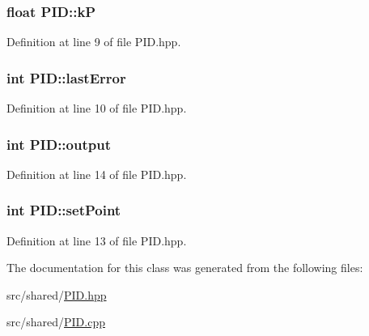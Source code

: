 \hypertarget{classPID_ac4815cca85109a6e13b10c2415104328}{
\subsubsection[{k\-P}]{\setlength{\rightskip}{0pt plus 5cm}float P\-I\-D\-::k\-P}}\label{classPID_ac4815cca85109a6e13b10c2415104328}


Definition at line 9 of file P\-I\-D.\-hpp.

\hypertarget{classPID_abbf07ac762e11dc7fedf56302c7bda8e}{
\subsubsection[{last\-Error}]{\setlength{\rightskip}{0pt plus 5cm}int P\-I\-D\-::last\-Error}}\label{classPID_abbf07ac762e11dc7fedf56302c7bda8e}


Definition at line 10 of file P\-I\-D.\-hpp.

\hypertarget{classPID_a34f2887b625d8d49e546b4e2fb389d04}{
\subsubsection[{output}]{\setlength{\rightskip}{0pt plus 5cm}int P\-I\-D\-::output}}\label{classPID_a34f2887b625d8d49e546b4e2fb389d04}


Definition at line 14 of file P\-I\-D.\-hpp.

\hypertarget{classPID_a2686d248042aff0e1730dd3a0b705fd2}{
\subsubsection[{set\-Point}]{\setlength{\rightskip}{0pt plus 5cm}int P\-I\-D\-::set\-Point}}\label{classPID_a2686d248042aff0e1730dd3a0b705fd2}


Definition at line 13 of file P\-I\-D.\-hpp.



The documentation for this class was generated from the following files\-:\begin{DoxyCompactItemize}
\item 
src/shared/\hyperlink{PID_8hpp}{P\-I\-D.\-hpp}\item 
src/shared/\hyperlink{PID_8cpp}{P\-I\-D.\-cpp}\end{DoxyCompactItemize}
